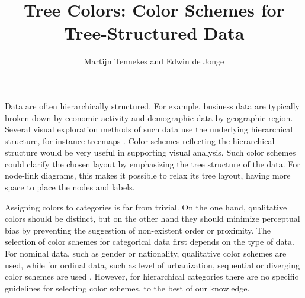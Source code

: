 \documentclass[journal]{vgtc}                %
\title{Tree Colors: Color Schemes for Tree-Structured Data}
\author{Martijn Tennekes and Edwin de Jonge}
\newcommand{\E}{\textcolor{cornellred}{\textbf{TO DO Edwin}}}
\newcommand{\changedE}[1]{\textcolor{cornellred}{#1}}
\newcommand{\changedM}[1]{\textcolor{blue}{#1}}
\begin{document}
\lstset{language=R}

\label{secintro}

\maketitle
Data are often hierarchically structured. For example, business data are typically broken down by economic activity and demographic data by geographic region. Several visual exploration methods of such data use the underlying hierarchical structure, for instance treemaps
\cite{shneiderman1992,tennekes2011b}. Color schemes reflecting the hierarchical structure would be very useful in supporting visual analysis. 
Such color schemes could clarify the chosen layout by emphasizing the tree structure of the data. For node-link diagrams, this makes it possible to relax its tree layout, having more space to place the nodes and labels.

Assigning colors to categories is far from trivial. On the one hand, qualitative colors should be distinct, but on the other hand they should minimize perceptual bias by preventing the suggestion of non-existent order or proximity. The selection of color schemes for categorical data first depends on the type of data. For nominal data, such as gender or nationality, qualitative color schemes are used, while for ordinal data, such as level of urbanization, sequential or diverging color schemes are used \cite{brewer03, zeileis2009}. However, for hierarchical categories there are no specific guidelines for selecting color schemes, to the best of our knowledge.


\end{document}
